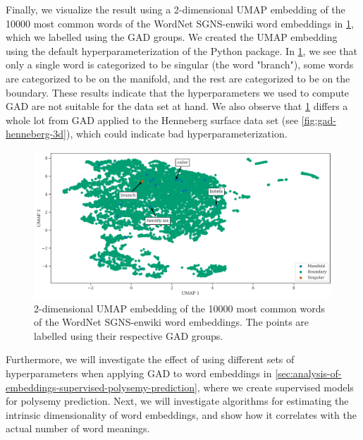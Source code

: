 Finally, we visualize the result using a 2-dimensional UMAP embedding of the 10000 most common words of the WordNet SGNS-enwiki word embeddings in \cref{fig:gad-umap-2d-10k-most-common-wordnet-enwiki-words}, which we labelled using the GAD groups. We created the UMAP embedding using the default hyperparameterization of the  Python package. In \cref{fig:gad-umap-2d-10k-most-common-wordnet-enwiki-words}, we see that only a single word is categorized to be singular (the word "branch"), some words are categorized to be on the manifold, and the rest are categorized to be on the boundary. These results indicate that the hyperparameters we used to compute GAD are not suitable for the data set at hand. We also observe that \cref{fig:gad-umap-2d-10k-most-common-wordnet-enwiki-words} differs a whole lot from GAD applied to the Henneberg surface data set (see \cref{fig:gad-henneberg-3d}), which could indicate bad hyperparameterization.
\begin{figure}[H]
    \centering
    \includegraphics[width=\textwidth]{thesis/figures/gad-umap-2d-10k-most-common-wordnet-enwiki-words.pdf}
    \caption{2-dimensional UMAP embedding of the 10000 most common words of the WordNet SGNS-enwiki word embeddings. The points are labelled using their respective GAD groups.}
    \label{fig:gad-umap-2d-10k-most-common-wordnet-enwiki-words}
\end{figure}

Furthermore, we will investigate the effect of using different sets of hyperparameters when applying GAD to word embeddings in \cref{sec:analysis-of-embeddings-supervised-polysemy-prediction}, where we create supervised models for polysemy prediction. Next, we will investigate algorithms for estimating the intrinsic dimensionality of word embeddings, and show how it correlates with the actual number of word meanings.

